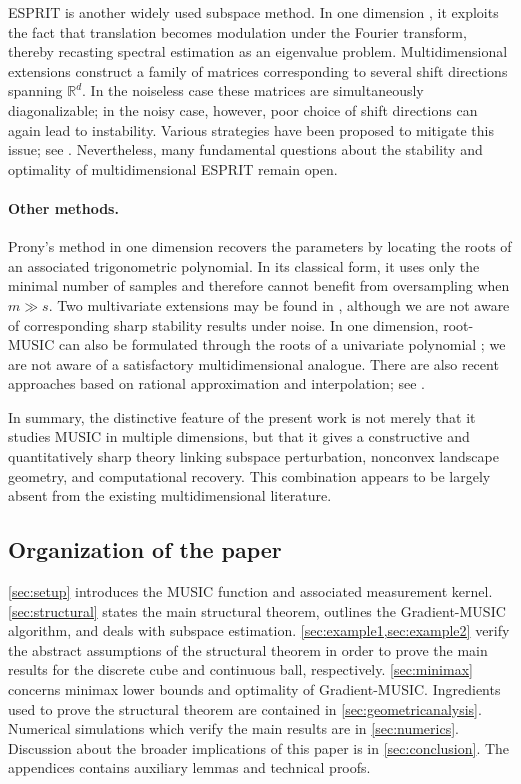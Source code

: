 \documentclass[11pt]{article}
\theoremstyle{definition}
\numberwithin{theorem}{section}
\numberwithin{lemma}{section}
\numberwithin{equation}{section}
\def\R{\mathbb{R}}
\numberwithin{equation}{section}
\begin{document}
ESPRIT is another widely used subspace method. In one dimension \cite{kailath1989esprit}, it exploits the fact that translation becomes modulation under the Fourier transform, thereby recasting spectral estimation as an eigenvalue problem. Multidimensional extensions construct a family of matrices corresponding to several shift directions spanning $\R^d$. In the noiseless case these matrices are simultaneously diagonalizable; in the noisy case, however, poor choice of shift directions can again lead to instability. Various strategies have been proposed to mitigate this issue; see \cite{abed1998least,haardt2002simultaneous,sahnoun2017multidimensional,andersson2018esprit}. Nevertheless, many fundamental questions about the stability and optimality of multidimensional ESPRIT remain open.

\paragraph{Other methods.}
Prony's method in one dimension \cite{prony1795essai,katz2024accuracy} recovers the parameters by locating the roots of an associated trigonometric polynomial. In its classical form, it uses only the minimal number of samples and therefore cannot benefit from oversampling when $m\gg s$. Two multivariate extensions may be found in \cite{kunis2016prony,sauer2017prony}, although we are not aware of corresponding sharp stability results under noise. In one dimension, root-MUSIC can also be formulated through the roots of a univariate polynomial \cite{rao2002performance}; we are not aware of a satisfactory multidimensional analogue. There are also recent approaches based on rational approximation and interpolation; see \cite{wilber2022data,derevianko2025parameter}.

In summary, the distinctive feature of the present work is not merely that it studies MUSIC in multiple dimensions, but that it gives a constructive and quantitatively sharp theory linking subspace perturbation, nonconvex landscape geometry, and computational recovery. This combination appears to be largely absent from the existing multidimensional literature.
	
\subsection{Organization of the paper}

\cref{sec:setup} introduces the MUSIC function and associated measurement kernel. \cref{sec:structural} states the main structural theorem, outlines the Gradient-MUSIC algorithm, and deals with subspace estimation. \cref{sec:example1,sec:example2} verify the abstract assumptions of the structural theorem in order to prove the main results for the discrete cube and continuous ball, respectively. \cref{sec:minimax} concerns minimax lower bounds and optimality of Gradient-MUSIC. Ingredients used to prove the structural theorem are contained in \cref{sec:geometricanalysis}. Numerical simulations which verify the main results are in \cref{sec:numerics}. Discussion about the broader implications of this paper is in \cref{sec:conclusion}. The appendices contains auxiliary lemmas and technical proofs.
\end{document}
